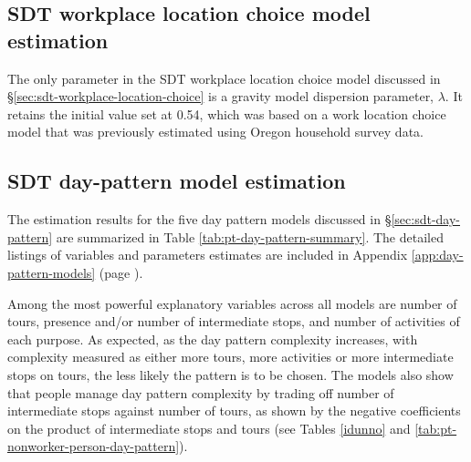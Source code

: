 \subsection{SDT workplace location choice model estimation}
The only parameter in the SDT workplace location choice model discussed in \S\ref{sec:sdt-workplace-location-choice} is a gravity model dispersion parameter, $\lambda$. It retains the initial value set at 0.54, which was based on a work location choice model that was previously estimated using Oregon household survey data.

\subsection{SDT day-pattern model estimation}\label{sec:pt-day-pattern-estimation}
The estimation results for the five day pattern models discussed in \S\ref{sec:sdt-day-pattern} are summarized in Table \ref{tab:pt-day-pattern-summary}. The detailed listings of variables and parameters estimates are included in Appendix \ref{app:day-pattern-models} (page \pageref{app:day-pattern-models}). 

Among the most powerful explanatory variables across all models are number of tours, presence and/or number of intermediate stops, and number of activities of each purpose. As expected, as the day pattern complexity increases, with complexity measured as either more tours, more activities or more intermediate stops on tours, the less likely the pattern is to be chosen. The models also show that people manage day pattern complexity by trading off number of intermediate stops against number of tours, as shown by the negative coefficients on the product of intermediate stops and tours (see Tables \ref{idunno} and \ref{tab:pt-nonworker-person-day-pattern}). %

